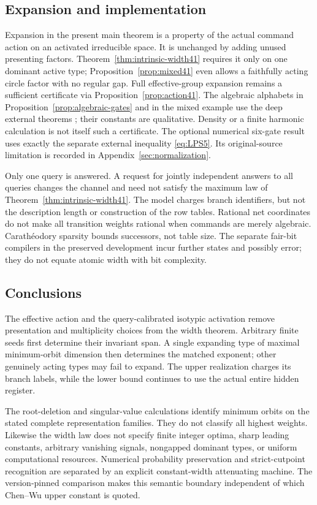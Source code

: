 \subsection{Expansion and implementation}
Expansion in the present main theorem is a property of the actual
command action on an activated irreducible space. It is unchanged by
adding unused presenting factors. Theorem~\ref{thm:intrinsic-width41}
requires it only on one dominant active type; Proposition~\ref{prop:mixed41}
even allows a faithfully acting circle factor with no regular gap.
Full effective-group expansion remains a sufficient certificate via
Proposition~\ref{prop:action41}. The algebraic alphabets in
Proposition~\ref{prop:algebraic-gates} and in the mixed example use the
deep external theorems \cite{BdS,BG12}; their constants are qualitative.
Density or a finite harmonic calculation is not itself such a certificate.
The optional numerical six-gate result uses exactly the separate
external inequality \eqref{eq:LPS5}. Its original-source limitation
is recorded in Appendix~\ref{sec:normalization}.

Only one query is answered. A request for jointly independent answers
to all queries changes the channel and need not satisfy the
maximum law of Theorem~\ref{thm:intrinsic-width41}. The model charges branch
identifiers, but not the description length or construction of the
row tables. Rational net coordinates do not make all transition
weights rational when commands are merely algebraic. Carath\'eodory
sparsity bounds successors, not table size. The separate fair-bit
compilers in the preserved development incur further states and
possibly error; they do not equate atomic width with bit complexity.

\subsection{Conclusions}
The effective action and the query-calibrated isotypic activation
remove presentation and multiplicity choices from the width theorem.
Arbitrary finite seeds first determine their invariant span. A single
expanding type of maximal minimum-orbit dimension then determines the
matched exponent; other genuinely acting types may fail to expand.
The upper realization charges its branch labels, while the lower bound
continues to use the actual entire hidden register.

The root-deletion and singular-value calculations identify minimum
orbits on the stated complete representation families. They do not
classify all highest weights. Likewise the width law does not specify
finite integer optima, sharp leading constants, arbitrary vanishing
signals, nongapped dominant types, or uniform computational resources.
Numerical probability preservation and strict-cutpoint recognition are
separated by an explicit constant-width attenuating machine. The
version-pinned comparison makes this semantic boundary independent of
which Chen--Wu upper constant is quoted.
